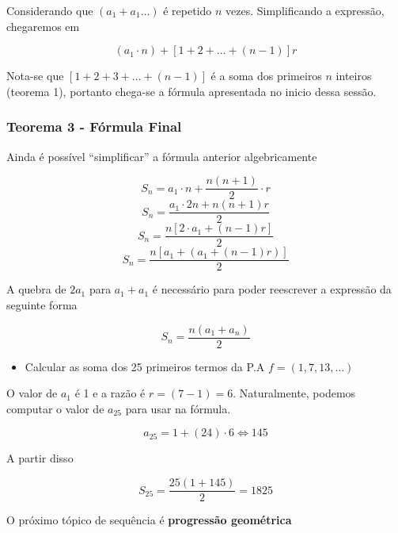 \documentclass[11pt]{article}
\begin{document}
Considerando que $(a_{1} + a_{1} \dots)$ é repetido $n$ vezes. Simplificando a expressão, chegaremos em

\begin{tcolorbox}[colback=LightYellow]
\[(a_{1}\cdot n) + [1 + 2 + \dots + (n - 1)]r\]
\end{tcolorbox}

Nota-se que $[1 + 2 + 3 + \dots + (n - 1)]$ é a soma dos primeiros $n$ inteiros (teorema 1), portanto chega-se a fórmula apresentada no inicio dessa sessão.

\subsubsection{Teorema 3 - Fórmula Final}

Ainda é possível ``simplificar'' a fórmula anterior algebricamente

\begin{tcolorbox}[colback=LightYellow]
\[S_{n} = a_{1} \cdot n + \frac{n(n + 1)}{2}\cdot r\]
\[S_{n} = \frac{a_{1}\cdot 2n + n(n + 1)r}{2}\]
\[S_{n} = \frac{n[2\cdot a_{1} + (n - 1)r]}{2}\]
\[S_{n} = \frac{n[a_{1} + (a_{1} + (n - 1)r)]}{2}\]
\end{tcolorbox}

A quebra de $2 a_{1}$ para $a_{1} + a_{1}$ é necessário para poder reescrever a expressão da seguinte forma

\begin{tcolorbox}[colback=LightBlue]
\[S_{n} = \frac{n(a_{1} + a_{n})}{2}\]
\end{tcolorbox}

\begin{tcolorbox}[colback=LightYellow]
\begin{itemize}
  \item Calcular as soma dos 25 primeiros termos da P.A $f = (1, 7, 13, \dots)$
\end{itemize}
\end{tcolorbox}

\begin{tcolorbox}[colback=LightYellow]

O valor de $a_{1}$ é 1 e a razão é $r = (7 - 1) = 6$. Naturalmente, podemos computar o valor de $a_{25}$ para usar na fórmula.

\[a_{25} = 1 + (24)\cdot 6 \Leftrightarrow 145\]

A partir disso

\[S_{25} = \frac{25(1 + 145)}{2} = 1825\]
\end{tcolorbox}

O próximo tópico de sequência é \textbf{progressão geométrica}
\end{document}
